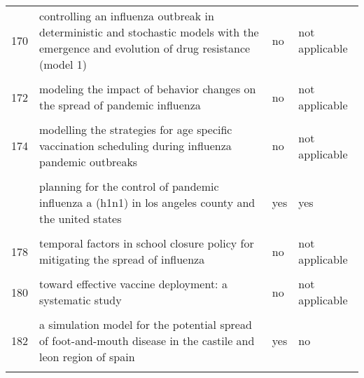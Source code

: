 \documentclass[
]{article}
\begin{document}
\begin{landscape}
\begin{longtable}{l>{\raggedright\arraybackslash}p{4cm}l>{\raggedright\arraybackslash}p{4cm}}
170 & controlling an influenza outbreak in deterministic and stochastic models with the emergence and evolution of drug resistance (model 1) & no & not applicable\\
\addlinespace
\cellcolor{gray!6}{171} & \cellcolor{gray!6}{modeling control strategies for concurrent epidemics of seasonal and pandemic h1n1 influenza} & \cellcolor{gray!6}{no} & \cellcolor{gray!6}{not applicable}\\
172 & modeling the impact of behavior changes on the spread of pandemic influenza & no & not applicable\\
\cellcolor{gray!6}{173} & \cellcolor{gray!6}{modelling and analysis of influenza a (h1n1) on networks} & \cellcolor{gray!6}{no} & \cellcolor{gray!6}{not applicable}\\
174 & modelling the strategies for age specific vaccination scheduling during influenza pandemic outbreaks & no & not applicable\\
\cellcolor{gray!6}{175} & \cellcolor{gray!6}{modelling the transmission dynamics and control of the novel 2009 swine influenza (h1n1) pandemic} & \cellcolor{gray!6}{no} & \cellcolor{gray!6}{not applicable}\\
\addlinespace
176 & planning for the control of pandemic influenza a (h1n1) in los angeles county and the united states & yes & yes\\
\cellcolor{gray!6}{177} & \cellcolor{gray!6}{prioritization of delayed vaccination for pandemic influenza} & \cellcolor{gray!6}{no} & \cellcolor{gray!6}{not applicable}\\
178 & temporal factors in school closure policy for mitigating the spread of influenza & no & not applicable\\
\cellcolor{gray!6}{179} & \cellcolor{gray!6}{the global transmission and control of influenza} & \cellcolor{gray!6}{no} & \cellcolor{gray!6}{not applicable}\\
180 & toward effective vaccine deployment: a systematic study & no & not applicable\\
\addlinespace
\cellcolor{gray!6}{181} & \cellcolor{gray!6}{vaccination against 2009 pandemic h1n1 in a population dynamical model of vancouver, canada: timing is everything} & \cellcolor{gray!6}{no} & \cellcolor{gray!6}{not applicable}\\
182 & a simulation model for the potential spread of foot-and-mouth disease in the castile and leon region of spain & yes & no\\
\cellcolor{gray!6}{183} & \cellcolor{gray!6}{community-based measures for mitigating the 2009 h1n1 pandemic in china} & \cellcolor{gray!6}{no} & \cellcolor{gray!6}{not applicable}\\

\end{longtable}
\end{landscape}
\end{document}
